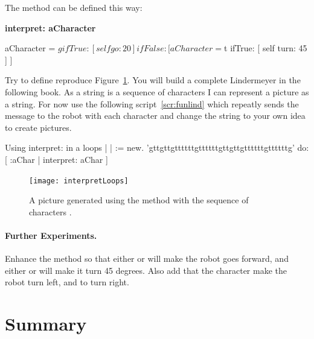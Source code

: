 The method  can be defined this way:

\begin{method}\label{mth:interpret}
\textbf{interpret: aCharacter}

   aCharacter = $g
      ifTrue: [ self go: 20 ]
      ifFalse: 
         [ aCharacter = $t
              ifTrue: [ self turn: 45 ] ]
\end{method}

Try to define reproduce Figure~\ref{fig:interloops}. You will build a complete Lindermeyer  in the following book.  As a string is a sequence of characters I can represent a picture as a string. For now use the following script~\ref{scr:funlind} which repeatly sends the message  to the robot with each character and change the string  to your own idea to create pictures. 

\begin{scriptwithtitle}{Using interpret: in a loops}\label{scr:funlind}
| \caro |
\caro := \Turtle new.
'gttgttgttttttgttttttgttgttgttttttgttttttg' 
    do: [ :aChar | \caro interpret: aChar ]
\end{scriptwithtitle}

\begin{figure}
\begin{center}\texttt{[image: interpretLoops]}
\caption{A picture generated using the method  with the sequence of characters . \label{fig:interloops}}
\end{center}
\end{figure}

\paragraph{Further Experiments.} Enhance the method  so that either  or 
will make the robot goes forward, and either  or  will make it turn 45 degrees. Also add that the character \ct{\$+} make the robot  turn left, and  \ct{\$-} to turn right. 









\section{Summary}

